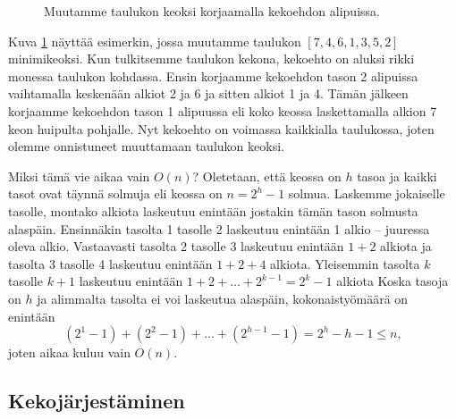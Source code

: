 \begin{figure}
\caption{Muutamme taulukon keoksi korjaamalla kekoehdon alipuissa.}
\label{fig:taukek}
\end{figure}

Kuva \ref{fig:taukek} näyttää esimerkin, jossa muutamme taulukon
$[7,4,6,1,3,5,2]$ minimikeoksi.
Kun tulkitsemme taulukon kekona, kekoehto on aluksi
rikki monessa taulukon kohdassa.
Ensin korjaamme kekoehdon tason 2 alipuissa vaihtamalla
keskenään alkiot 2 ja 6 ja sitten alkiot 1 ja 4.
Tämän jälkeen korjaamme kekoehdon tason 1 alipuussa
eli koko keossa laskettamalla alkion 7 keon huipulta pohjalle.
Nyt kekoehto on voimassa kaikkialla taulukossa,
joten olemme onnistuneet muuttamaan taulukon keoksi.

Miksi tämä vie aikaa vain $O(n)$?
Oletetaan, että keossa on $h$ tasoa ja kaikki
tasot ovat täynnä solmuja eli keossa on $n=2^h-1$ solmua.
Laskemme jokaiselle tasolle, montako alkiota laskeutuu
enintään jostakin tämän tason solmusta alaspäin.
Ensinnäkin tasolta 1 tasolle 2 laskeutuu enintään 1 alkio --
juuressa oleva alkio.
Vastaavasti
tasolta 2 tasolle 3 laskeutuu enintään $1+2$ alkiota
ja
tasolta 3 tasolle 4 laskeutuu enintään $1+2+4$ alkiota.
Yleisemmin tasolta $k$ tasolle $k+1$ laskeutuu
enintään $1+2+\dots+2^{k-1} = 2^k-1$ alkiota
Koska tasoja on $h$ ja alimmalta tasolta ei voi laskeutua alaspäin,
kokonaistyömäärä on enintään
\[(2^1-1)+(2^2-1)+\dots+(2^{h-1}-1)=2^h-h-1 \le n,\]
joten aikaa kuluu vain $O(n)$.

\subsection{Kekojärjestäminen}

